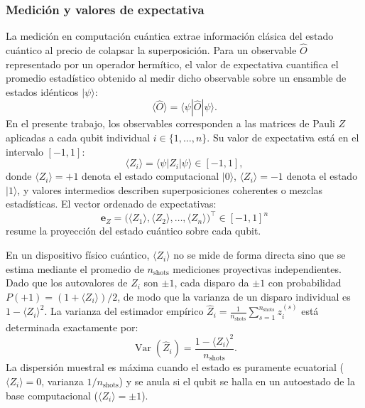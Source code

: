 
\subsubsection{Medición y valores de expectativa}

La medición en computación cuántica extrae información clásica del estado cuántico
al precio de colapsar la superposición. Para un observable $\hat{O}$ representado
por un operador hermítico, el valor de expectativa cuantifica el promedio estadístico
obtenido al medir dicho observable sobre un ensamble de estados idénticos $|\psi\rangle$:
\begin{equation}
  \langle \hat{O} \rangle = \langle \psi | \hat{O} | \psi \rangle.
  \label{eq:expectation}
\end{equation}
En el presente trabajo, los observables corresponden a las matrices
de Pauli $Z$ aplicadas a cada qubit individual $i \in \{1, \dots, n\}$. Su valor
de expectativa está en el intervalo $[-1, 1]$:
\begin{equation}
  \langle Z_i \rangle = \langle \psi | Z_i | \psi \rangle \in [-1, 1],
  \label{eq:expZ}
\end{equation}
donde $\langle Z_i \rangle = +1$ denota el estado computacional $|0\rangle$,
$\langle Z_i \rangle = -1$ denota el estado $|1\rangle$, y valores intermedios
describen superposiciones coherentes o mezclas estadísticas. El vector ordenado de
expectativas:
\begin{equation}
  \mathbf{e}_Z = \bigl(\langle Z_1 \rangle, \langle Z_2 \rangle, \dots, \langle Z_n \rangle\bigr)^\top \in [-1, 1]^n
  \label{eq:expZ_vector}
\end{equation}
resume la proyección del estado cuántico sobre cada qubit.

En un dispositivo físico cuántico, $\langle Z_i \rangle$ no se mide de forma
directa sino que se estima mediante el promedio de $n_{\text{shots}}$ mediciones
proyectivas independientes. Dado que los autovalores de $Z_i$ son $\pm 1$, cada disparo da $\pm 1$ con probabilidad $P(+1) = (1+\langle Z_i\rangle)/2$, de modo que la varianza de un disparo individual es $1-\langle Z_i\rangle^2$. La varianza del estimador empírico
$\hat{Z}_i = \frac{1}{n_{\text{shots}}} \sum_{s=1}^{n_{\text{shots}}} z_i^{(s)}$
está determinada exactamente por:
\begin{equation}
  \operatorname{Var}(\hat{Z}_i) = \frac{1 - \langle Z_i \rangle^2}{n_{\text{shots}}}.
  \label{eq:shot_noise_variance}
\end{equation}
La dispersión muestral es máxima cuando el estado es puramente ecuatorial
($\langle Z_i \rangle = 0$, varianza $1/n_{\text{shots}}$) y se anula si el qubit
se halla en un autoestado de la base computacional ($\langle Z_i \rangle = \pm 1$).

